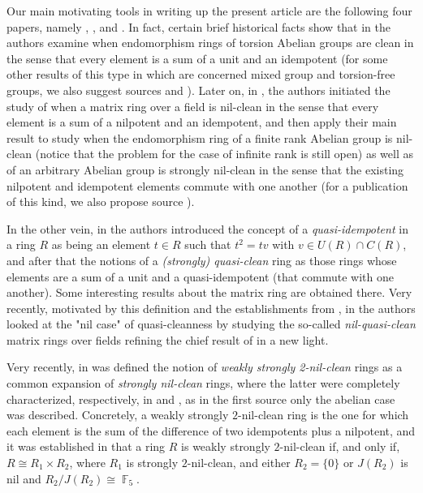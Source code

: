 \documentclass{amsart}
\DeclareMathOperator{\F}{\mathbb{F}}
\theoremstyle{definition}
\theoremstyle{remark}
\numberwithin{equation}{section}
\begin{document}
Our main motivating tools in writing up the present article are the following four papers, namely \cite{BCDM13}, \cite{GV}, \cite{Su} and \cite{quasi-clean}. In fact, certain brief historical facts show that in \cite{GV} the authors examine when endomorphism rings of torsion Abelian groups are clean in the sense that every element is a sum of a unit and an idempotent (for some other results of this type in which are concerned mixed group and torsion-free groups, we also suggest sources \cite{C} and \cite{S}). Later on, in \cite{BCDM13}, the authors initiated the study of when a matrix ring over a field is nil-clean in the sense that every element is a sum of a nilpotent and an idempotent, and then apply their main result to study when the endomorphism ring of a finite rank Abelian group is nil-clean (notice that the problem for the case of infinite rank is still open) as well as of an arbitrary Abelian group is strongly nil-clean in the sense that the existing nilpotent and idempotent elements commute with one another (for a publication of this kind, we also propose source \cite{ABD}).

In the other vein, in \cite{quasi-clean} the authors introduced the concept of a {\it quasi-idempotent} in a ring $R$ as being an element $t\in R$ such that $t^2=tv$ with $v\in U(R)\cap C(R)$, and after that the notions of a {\it (strongly) quasi-clean} ring as those rings whose elements are a sum of a unit and a quasi-idempotent (that commute with one another). Some interesting results about the matrix ring are obtained there. Very recently, motivated by this definition and the establishments from \cite{BCDM13}, in \cite{Su} the authors looked at the "nil case" of quasi-cleanness by studying the so-called {\it nil-quasi-clean} matrix rings over fields refining the chief result of \cite{BCDM13} in a new light.

Very recently, in \cite{DM26} was defined the notion of {\it weakly strongly 2-nil-clean} rings as a common expansion of {\it strongly nil-clean} rings, where the latter were completely characterized, respectively, in \cite{BDZ} and \cite{KZ16}, as in the first source only the abelian case was described. Concretely, a weakly strongly $2$-nil-clean ring is the one for which each element is the sum of the difference of two idempotents plus a nilpotent, and it was established in \cite{DM26} that a ring $R$ is weakly strongly $2$-nil-clean if, and only if, $R\cong R_1\times R_2$, where $R_1$ is strongly $2$-nil-clean, and either $R_2=\{0\}$ or $J(R_2)$ is nil and $R_2/J(R_2)\cong \F_5$.
\end{document}
